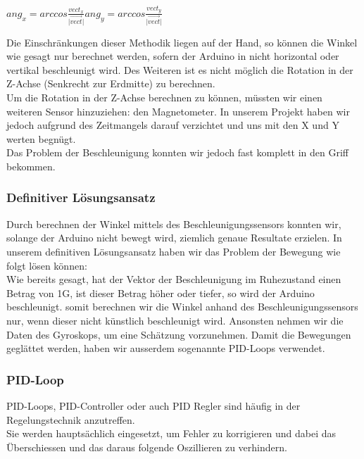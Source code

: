 \begin{math}
ang_x = arccos{\frac{vect_x}{\lvert\overrightarrow{vect}\rvert}}
ang_y = arccos{\frac{vect_y}{\lvert\overrightarrow{vect}\rvert}}
\end{math}

Die Einschränkungen dieser Methodik liegen auf der Hand, so können die Winkel wie gesagt nur berechnet werden, sofern der Arduino in nicht horizontal oder vertikal beschleunigt wird.
Des Weiteren ist es nicht möglich die Rotation in der Z-Achse (Senkrecht zur Erdmitte) zu berechnen.\\
Um die Rotation in der Z-Achse berechnen zu können, müssten wir einen weiteren Sensor hinzuziehen: den Magnetometer. 
In unserem Projekt haben wir jedoch aufgrund des Zeitmangels darauf verzichtet und uns mit den X und Y werten begnügt.\\
Das Problem der Beschleunigung konnten wir jedoch fast komplett in den Griff bekommen.

\subsubsection{Definitiver Lösungsansatz}
Durch berechnen der Winkel mittels des Beschleunigungssensors konnten wir, solange der Arduino nicht bewegt wird, ziemlich genaue Resultate erzielen.
In unserem definitiven Lösungsansatz haben wir das Problem der Bewegung wie folgt lösen können:\\
Wie bereits gesagt, hat der Vektor der Beschleunigung im Ruhezustand einen Betrag von 1G, ist dieser Betrag höher oder tiefer, so wird der Arduino beschleunigt.
somit berechnen wir die Winkel anhand des Beschleunigungssensors nur, wenn dieser nicht künstlich beschleunigt wird.
Ansonsten nehmen wir die Daten des Gyroskops, um eine Schätzung vorzunehmen.
Damit die Bewegungen geglättet werden, haben wir ausserdem sogenannte PID-Loops verwendet.


\subsubsection{PID-Loop}
PID-Loops, PID-Controller oder auch PID Regler sind häufig in der Regelungstechnik anzutreffen.\\
Sie werden hauptsächlich eingesetzt, um Fehler zu korrigieren und dabei das Überschiessen und das daraus folgende Oszillieren zu verhindern.\\

